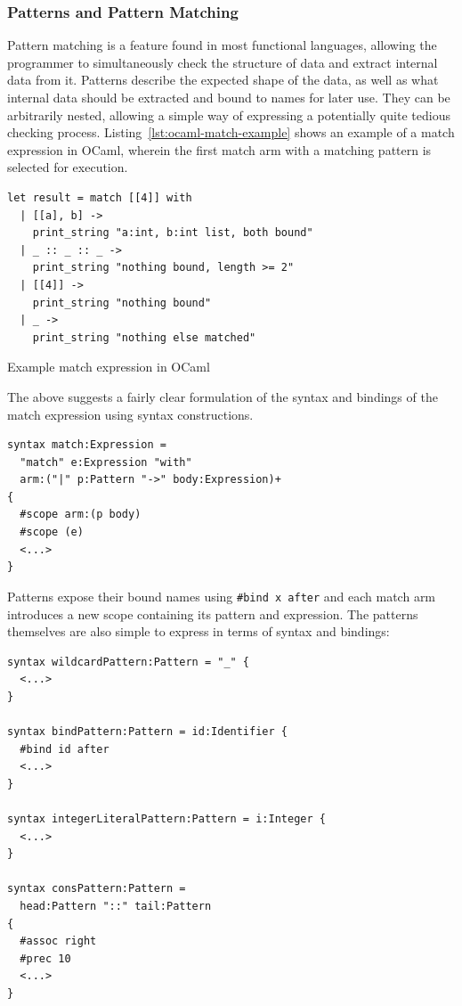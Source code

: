\documentclass{kththesis}
\begin{document}
\subsubsection{Patterns and Pattern Matching} \label{sec:functional-pattern-matching}

Pattern matching is a feature found in most functional languages, allowing the programmer to simultaneously check the structure of data and extract internal data from it. Patterns describe the expected shape of the data, as well as what internal data should be extracted and bound to names for later use. They can be arbitrarily nested, allowing a simple way of expressing a potentially quite tedious checking process. Listing~\ref{lst:ocaml-match-example} shows an example of a match expression in OCaml, wherein the first match arm with a matching pattern is selected for execution.

\begin{listing}[ht]
\begin{verbatim}
let result = match [[4]] with
  | [[a], b] ->
    print_string "a:int, b:int list, both bound"
  | _ :: _ :: _ ->
    print_string "nothing bound, length >= 2"
  | [[4]] ->
    print_string "nothing bound"
  | _ ->
    print_string "nothing else matched"
\end{verbatim}
\caption{Example match expression in OCaml}
\label{lst:ocaml-match-example}
\end{listing}

The above suggests a fairly clear formulation of the syntax and bindings of the match expression using syntax constructions.

\begin{verbatim}
syntax match:Expression =
  "match" e:Expression "with"
  arm:("|" p:Pattern "->" body:Expression)+
{
  #scope arm:(p body)
  #scope (e)
  <...>
}
\end{verbatim}

Patterns expose their bound names using \texttt{#bind x after} and each match arm introduces a new scope containing its pattern and expression. The patterns themselves are also simple to express in terms of syntax and bindings:

\begin{verbatim}
syntax wildcardPattern:Pattern = "_" {
  <...>
}

syntax bindPattern:Pattern = id:Identifier {
  #bind id after
  <...>
}

syntax integerLiteralPattern:Pattern = i:Integer {
  <...>
}

syntax consPattern:Pattern =
  head:Pattern "::" tail:Pattern
{
  #assoc right
  #prec 10
  <...>
}
\end{verbatim}
\end{document}
